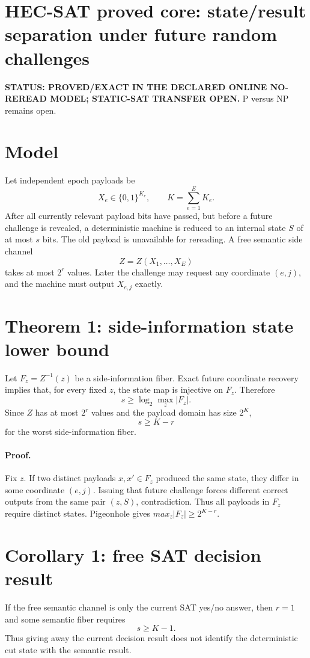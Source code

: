 \documentclass[11pt]{article}
\begin{document}
\section*{HEC-SAT proved core: state/result separation under future random challenges}
\textbf{STATUS: PROVED/EXACT IN THE DECLARED ONLINE NO-REREAD MODEL; STATIC-SAT TRANSFER OPEN.} P versus NP remains open.

\section*{Model}
Let independent epoch payloads be
\[
X_e\in\{0,1\}^{K_e},
\qquad K=\sum_{e=1}^E K_e.
\]
After all currently relevant payload bits have passed, but before a future challenge is revealed, a deterministic machine is reduced to an internal state \(S\) of at most \(s\) bits. The old payload is unavailable for rereading. A free semantic side channel
\[
Z=Z(X_1,\ldots,X_E)
\]
takes at most \(2^r\) values. Later the challenge may request any coordinate \((e,j)\), and the machine must output \(X_{e,j}\) exactly.

\section*{Theorem 1: side-information state lower bound}
Let \(F_z=Z^{-1}(z)\) be a side-information fiber. Exact future coordinate recovery implies that, for every fixed \(z\), the state map is injective on \(F_z\). Therefore
\[
s\ge \log_2 \max_z |F_z|.
\]
Since \(Z\) has at most \(2^r\) values and the payload domain has size \(2^K\),
\[
\boxed{s\ge K-r}
\]
for the worst side-information fiber.

\paragraph{Proof.}
Fix \(z\). If two distinct payloads \(x,x'\in F_z\) produced the same state, they differ in some coordinate \((e,j)\). Issuing that future challenge forces different correct outputs from the same pair \((z,S)\), contradiction. Thus all payloads in \(F_z\) require distinct states. Pigeonhole gives \(max_z|F_z|\ge 2^{K-r}\).

\section*{Corollary 1: free SAT decision result}
If the free semantic channel is only the current SAT yes/no answer, then \(r=1\) and some semantic fiber requires
\[
\boxed{s\ge K-1.}
\]
Thus giving away the current decision result does not identify the deterministic cut state with the semantic result.
\end{document}
